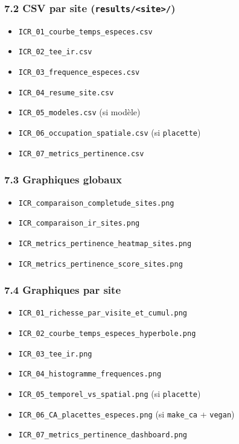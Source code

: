 \subsubsection{\texorpdfstring{7.2 CSV par site
(\texttt{results/\textless{}site\textgreater{}/})}{7.2 CSV par site (results/\textless site\textgreater/)}}\label{csv-par-site-resultssite}

\begin{itemize}
\tightlist
\item
  \texttt{ICR\_01\_courbe\_temps\_especes.csv}
\item
  \texttt{ICR\_02\_tee\_ir.csv}
\item
  \texttt{ICR\_03\_frequence\_especes.csv}
\item
  \texttt{ICR\_04\_resume\_site.csv}
\item
  \texttt{ICR\_05\_modeles.csv} (si modèle)
\item
  \texttt{ICR\_06\_occupation\_spatiale.csv} (si \texttt{placette})
\item
  \texttt{ICR\_07\_metrics\_pertinence.csv}
\end{itemize}

\subsubsection{7.3 Graphiques globaux}\label{graphiques-globaux}

\begin{itemize}
\tightlist
\item
  \texttt{ICR\_comparaison\_completude\_sites.png}
\item
  \texttt{ICR\_comparaison\_ir\_sites.png}
\item
  \texttt{ICR\_metrics\_pertinence\_heatmap\_sites.png}
\item
  \texttt{ICR\_metrics\_pertinence\_score\_sites.png}
\end{itemize}

\subsubsection{7.4 Graphiques par site}\label{graphiques-par-site}

\begin{itemize}
\tightlist
\item
  \texttt{ICR\_01\_richesse\_par\_visite\_et\_cumul.png}
\item
  \texttt{ICR\_02\_courbe\_temps\_especes\_hyperbole.png}
\item
  \texttt{ICR\_03\_tee\_ir.png}
\item
  \texttt{ICR\_04\_histogramme\_frequences.png}
\item
  \texttt{ICR\_05\_temporel\_vs\_spatial.png} (si \texttt{placette})
\item
  \texttt{ICR\_06\_CA\_placettes\_especes.png} (si \texttt{make\_ca} +
  \texttt{vegan})
\item
  \texttt{ICR\_07\_metrics\_pertinence\_dashboard.png}
\end{itemize}

